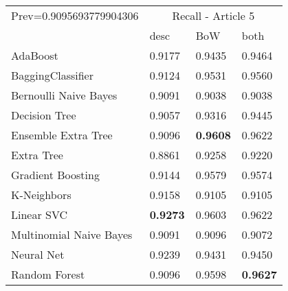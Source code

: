\begin{tabular}{|l|l|l|l| }
\hline
Prev=0.9095693779904306 &  \multicolumn{3}{c|}{Recall - Article 5} \\
\cline{2-4} & desc & BoW & both \\ \hline
AdaBoost                & 0.9177 & 0.9435 & 0.9464\\
BaggingClassifier       & 0.9124 & 0.9531 & 0.9560\\
Bernoulli Naive Bayes   & 0.9091 & 0.9038 & 0.9038\\
Decision Tree           & 0.9057 & 0.9316 & 0.9445\\
Ensemble Extra Tree     & 0.9096 & {\bf 0.9608} & 0.9622\\
Extra Tree              & 0.8861 & 0.9258 & 0.9220\\
Gradient Boosting       & 0.9144 & 0.9579 & 0.9574\\
K-Neighbors             & 0.9158 & 0.9105 & 0.9105\\
Linear SVC              & {\bf 0.9273} & 0.9603 & 0.9622\\
Multinomial Naive Bayes & 0.9091 & 0.9096 & 0.9072\\
Neural Net              & 0.9239 & 0.9431 & 0.9450\\
Random Forest           & 0.9096 & 0.9598 & {\bf 0.9627}\\
\hline
\end{tabular}
